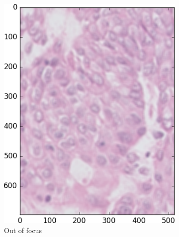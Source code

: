 \documentclass[a4paper,10pt]{article}
\begin{document}
\begin{figure}
\begin{multicols}{3}
\begin{subfigure}{0.33\textwidth}
    \includegraphics[width=\linewidth]{blur.png}\par 
    \caption{Out of focus}
    \label{fig:blur}
	\end{subfigure}%
	\begin{subfigure}{0.33\textwidth}

\end{subfigure}
\end{multicols}
\end{figure}
\end{document}
